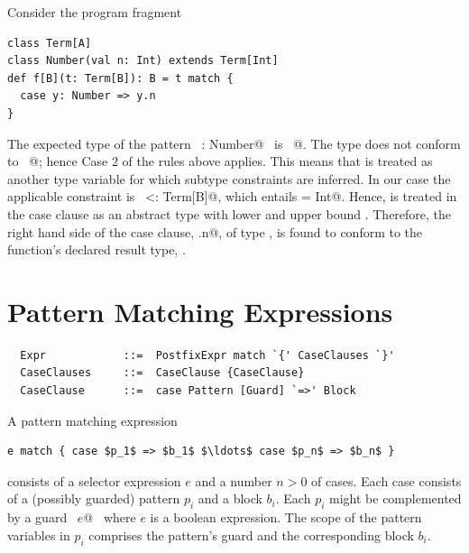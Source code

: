 \example
Consider the program fragment
\begin{lstlisting}
class Term[A]
class Number(val n: Int) extends Term[Int]
def f[B](t: Term[B]): B = t match {
  case y: Number => y.n
}
\end{lstlisting}
The expected type of the pattern ~\lstinline@y: Number@~ is
~\lstinline@Term[B]@.  The type  does not conform to
~\lstinline@Term[B]@; hence Case 2 of the rules above
applies. This means that \lstinline@b@ is treated as another type
variable for which subtype constraints are inferred. In our case the
applicable constraint is ~\lstinline@Number <: Term[B]@, which
entails \lstinline@B = Int@.  Hence, \lstinline@B@ is treated in
the case clause as an abstract type with lower and upper bound
\lstinline@Int@. Therefore, the right hand side of the case clause,
\lstinline@y.n@, of type \lstinline@Int@, is found to conform to the
function's declared result type, \lstinline@Number@.

\section{Pattern Matching Expressions}
\label{sec:pattern-match}

\syntax\begin{lstlisting}
  Expr            ::=  PostfixExpr match `{' CaseClauses `}'
  CaseClauses     ::=  CaseClause {CaseClause}
  CaseClause      ::=  case Pattern [Guard] `=>' Block
\end{lstlisting}

A pattern matching expression
\begin{lstlisting}
e match { case $p_1$ => $b_1$ $\ldots$ case $p_n$ => $b_n$ }
\end{lstlisting}
consists of a selector expression $e$ and a number $n > 0$ of
cases. Each case consists of a (possibly guarded) pattern $p_i$ and a
block $b_i$. Each $p_i$ might be complemented by a guard
~\lstinline@if $e$@~ where $e$ is a boolean expression. 
The scope of the pattern
variables in $p_i$ comprises the pattern's guard and the corresponding block $b_i$.

